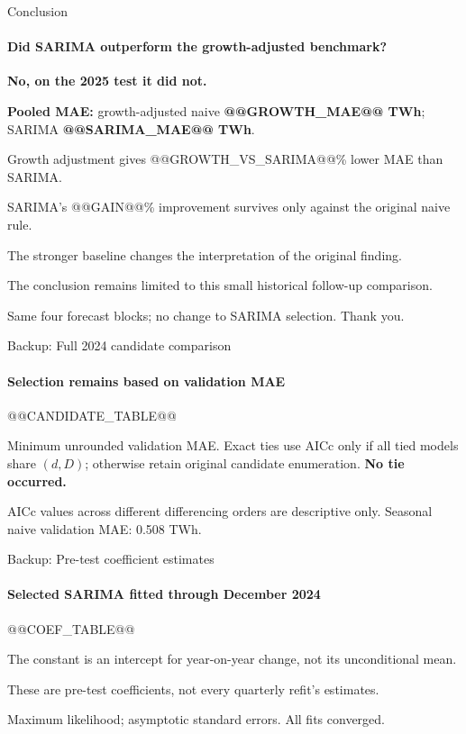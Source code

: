 \documentclass[aspectratio=169,10pt]{beamer}
\newcommand{\Source}[1]{\par\vfill{\fontsize{6.5}{7.5}\selectfont\color{black!65}#1\par}}
\begin{document}
\begin{frame}[t]{Conclusion}
\framesubtitle{Did SARIMA outperform the growth-adjusted benchmark?}
\par\bigskip
{\Large\bfseries No, on the 2025 test it did not.\par}
\par\bigskip
\textbf{Pooled MAE:} growth-adjusted naive \textbf{@@GROWTH_MAE@@ TWh};\\SARIMA \textbf{@@SARIMA_MAE@@ TWh}.
\par\medskip\par
Growth adjustment gives @@GROWTH_VS_SARIMA@@\% lower MAE than SARIMA.\par
SARIMA's @@GAIN@@\% improvement survives only against the original naive rule.
\par\bigskip
The stronger baseline changes the interpretation of the original finding.\par
The conclusion remains limited to this small historical follow-up comparison.
\Source{Same four forecast blocks; no change to SARIMA selection. Thank you.}
\end{frame}

\appendix
\begin{frame}[t]{Backup: Full 2024 candidate comparison}
\framesubtitle{Selection remains based on validation MAE}
\begin{center}
@@CANDIDATE_TABLE@@
\end{center}
\small Minimum unrounded validation MAE. Exact ties use AICc only if all tied models share $(d,D)$; otherwise retain original candidate enumeration. \textbf{No tie occurred.}
\Source{AICc values across different differencing orders are descriptive only. Seasonal naive validation MAE: 0.508 TWh.}
\end{frame}

\begin{frame}[t]{Backup: Pre-test coefficient estimates}
\framesubtitle{Selected SARIMA fitted through December 2024}
\begin{center}
@@COEF_TABLE@@
\end{center}
\par\medskip
The constant is an intercept for year-on-year change, not its unconditional mean.\par
These are pre-test coefficients, not every quarterly refit's estimates.
\Source{Maximum likelihood; asymptotic standard errors. All fits converged.}
\end{frame}
\end{document}

